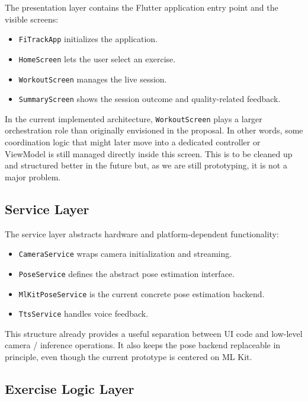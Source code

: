 \documentclass[12pt,a4paper]{article}
\begin{document}
The presentation layer contains the Flutter application entry point and the visible screens:

\begin{itemize}
    \item \texttt{FiTrackApp} initializes the application.
    \item \texttt{HomeScreen} lets the user select an exercise.
    \item \texttt{WorkoutScreen} manages the live session.
    \item \texttt{SummaryScreen} shows the session outcome and quality-related feedback.
\end{itemize}

In the current implemented architecture, \texttt{WorkoutScreen} plays a larger orchestration role than originally envisioned in the proposal. In other words, some coordination logic that might later move into a dedicated controller or ViewModel is still managed directly inside this screen. This is to be cleaned up and structured better in the future but, as we are still prototyping, it is not a major problem.

\subsection{Service Layer}

The service layer abstracts hardware and platform-dependent functionality:

\begin{itemize}
    \item \texttt{CameraService} wraps camera initialization and streaming.
    \item \texttt{PoseService} defines the abstract pose estimation interface.
    \item \texttt{MlKitPoseService} is the current concrete pose estimation backend.
    \item \texttt{TtsService} handles voice feedback.
\end{itemize}

This structure already provides a useful separation between UI code and low-level camera / inference operations. It also keeps the pose backend replaceable in principle, even though the current prototype is centered on ML Kit.

\subsection{Exercise Logic Layer}
\end{document}
